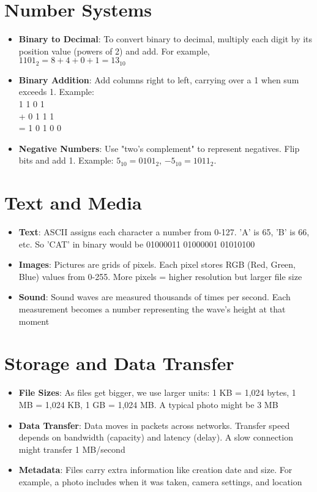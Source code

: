 \section{Number Systems}
\begin{itemize}
    \item \textbf{Binary to Decimal}: To convert binary to decimal, multiply each digit by its position value (powers of 2) and add. For example, $1101_2 = 8 + 4 + 0 + 1 = 13_{10}$
    \item \textbf{Binary Addition}: Add columns right to left, carrying over a 1 when sum exceeds 1. Example:\\
    \hspace{1cm}  1 1 0 1\\
    \hspace{1cm}+ 0 1 1 1\\
    \hspace{1cm}= 1 0 1 0 0
    \item \textbf{Negative Numbers}: Use "two's complement" to represent negatives. Flip bits and add 1. Example: $5_{10} = 0101_2$, $-5_{10} = 1011_2$.
\end{itemize}

\section{Text and Media}
\begin{itemize}
    \item \textbf{Text}: ASCII assigns each character a number from 0-127. 'A' is 65, 'B' is 66, etc. So 'CAT' in binary would be 01000011 01000001 01010100
    \item \textbf{Images}: Pictures are grids of pixels. Each pixel stores RGB (Red, Green, Blue) values from 0-255. More pixels = higher resolution but larger file size
    \item \textbf{Sound}: Sound waves are measured thousands of times per second. Each measurement becomes a number representing the wave's height at that moment
\end{itemize}

\section{Storage and Data Transfer}
\begin{itemize}
    \item \textbf{File Sizes}: As files get bigger, we use larger units: 1 KB = 1,024 bytes, 1 MB = 1,024 KB, 1 GB = 1,024 MB. A typical photo might be 3 MB
    \item \textbf{Data Transfer}: Data moves in packets across networks. Transfer speed depends on bandwidth (capacity) and latency (delay). A slow connection might transfer 1 MB/second
    \item \textbf{Metadata}: Files carry extra information like creation date and size. For example, a photo includes when it was taken, camera settings, and location
\end{itemize}

